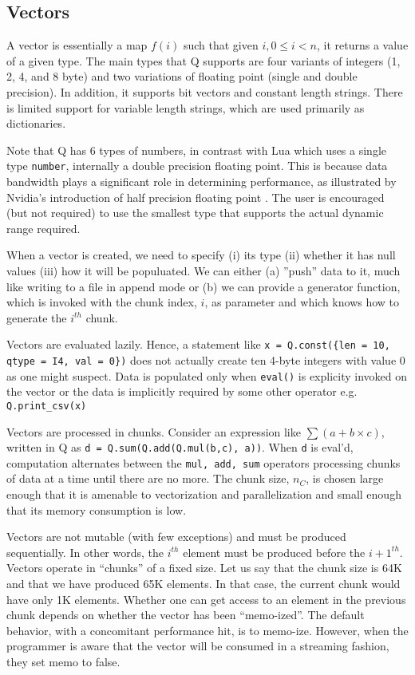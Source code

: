\subsection{Vectors}
\label{Vectors}
A vector is essentially a map \(f(i)\) such that given \(i, 0 \leq i < n\), it
returns a value of a given type. The main types that Q supports are four variants
of integers (1, 2, 4, and 8 byte) and two variations of floating point (single
and double precision). In addition, it supports bit vectors and constant length
strings. There is limited support for variable length strings, which are used
primarily as dictionaries. 

Note that Q has 6 types of numbers, in contrast with Lua which uses a 
single type {\tt number}, internally a double precision floating point.
This is because data bandwidth plays a significant role in determining
performance, as illustrated by Nvidia's
introduction of half precision floating point  \cite{nvidia2017}. The user is
encouraged (but not required) to use the smallest type that supports the actual
dynamic range required. 


When a vector is created, we need to specify (i) its type (ii) whether it has
null values (iii) how it will be populuated. We can either (a) ''push'' data to
it, much like writing to a file in append mode or (b) we can provide a generator function,
which is invoked with the chunk index, \(i\), as parameter and which knows how to
generate the \(i^{th}\) chunk.

Vectors are evaluated lazily. Hence, a statement like 
{\tt x = Q.const(\{len = 10, qtype = I4, val = 0\})} does not actually create
ten
4-byte integers with value 0 as one might suspect. Data is populated only when
{\tt eval()} is explicity invoked on the vector or the data is 
implicitly required by some other operator e.g. {\tt Q.print\_csv(x)}

Vectors are processed in chunks. Consider an expression  like \(\sum (a + b\times
c)\), written in Q as {\tt d = Q.sum(Q.add(Q.mul(b,c), a))}.
When {\tt d} is eval'd, computation alternates between the {\tt mul, add, sum}
operators
processing chunks of data at a time until there are
no more.
The chunk size, \(n_C\), is chosen large enough that it is amenable to
vectorization and parallelization and small enough that its memory consumption
is low.


Vectors are not mutable (with few exceptions)
and must be produced sequentially. In other words, the \(i^{th}\) element must
be produced before the \({i+1}^{th}\). Vectors
operate in ``chunks'' of a fixed size. Let us say that the chunk size is 64K and
that we have produced 65K elements. In that case, the current chunk would have
only 1K elements. Whether one can get access to an element in the previous chunk
depends on whether the vector has been ``memo-ized''. The default behavior, with
a concomitant performance hit, is to memo-ize. However, when the programmer is
aware that the vector will be consumed in a streaming fashion, they set memo
to false. 

